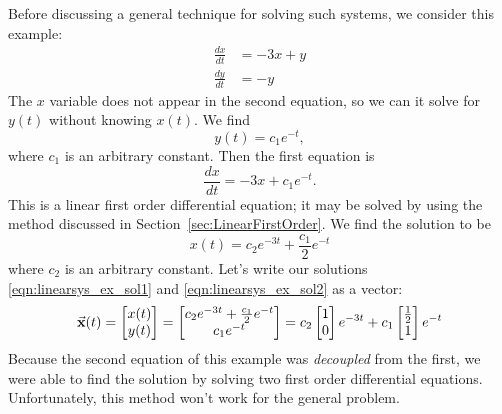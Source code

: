 \begin{xexample}
Before discussing a general technique for
solving such systems, we consider this example:
\begin{equation}
\begin{split}
  \frac{dx}{dt} & = -3x + y \\
  \frac{dy}{dt} & = -y
\end{split}
\label{eqn:linearsys_ex}
\end{equation}
The $x$ variable does not appear in the second equation,
so we can it solve for $y(t)$ without knowing $x(t)$. We find
\begin{equation}
y(t) = c_1 e^{-t},
\label{eqn:linearsys_ex_sol1}
\end{equation}
where $c_1$ is an arbitrary constant.
Then the first equation is
\begin{equation}
  \frac{dx}{dt} = -3x + c_1 e^{-t}.
\end{equation}
This is a linear first order differential equation; it may be
solved by using the method discussed in Section~\ref{sec:LinearFirstOrder}.
We find the solution to be
\begin{equation}
   x(t) = c_2 e^{-3t} + \frac{c_1}{2}e^{-t}
\label{eqn:linearsys_ex_sol2}
\end{equation}
where $c_2$ is an arbitrary constant.
Let's write our solutions \eqref{eqn:linearsys_ex_sol1}
and \eqref{eqn:linearsys_ex_sol2} as a vector:
\begin{equation}
  \vec{\textbf{x}}(t) = \begin{bmatrix}
                x(t) \\ y(t)
           \end{bmatrix}
         =
           \begin{bmatrix}
               c_2 e^{-3t} + \frac{c_1}{2} e^{-t} \\
               c_1 e^{-t}
           \end{bmatrix}
         =
           c_2 \begin{bmatrix}
               1 \\ 0
           \end{bmatrix} e^{-3t}
           + c_1 \begin{bmatrix}
               \frac{1}{2} \\
               1
           \end{bmatrix} e^{-t}
\label{eqn:linearsys_ex_vecsol}
\end{equation}
Because the second equation of this example was
\emph{decoupled} from the first, we were able to
find the solution by solving two first order differential equations.
Unfortunately, this method won't work for the general problem.
\end{xexample}

